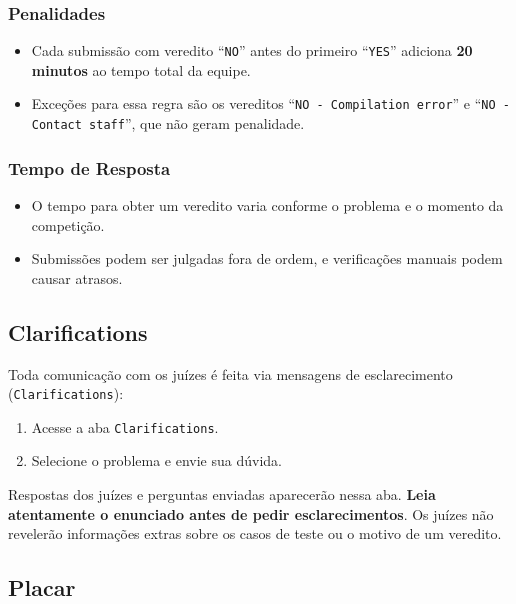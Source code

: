 \documentclass{article}
\begin{document}
\begin{titlepage}
\subsubsection{Penalidades}

\begin{itemize}
    \item Cada submissão com veredito ``\texttt{NO}'' antes do primeiro ``\texttt{YES}'' adiciona \textbf{20 minutos} ao tempo total da equipe.
    \item Exceções para essa regra são os vereditos ``\texttt{NO - Compilation error}'' e ``\texttt{NO - Contact staff}'', que não geram penalidade.
\end{itemize}

\subsubsection{Tempo de Resposta}

\begin{itemize}
    \item O tempo para obter um veredito varia conforme o problema e o momento da competição.
    \item Submissões podem ser julgadas fora de ordem, e verificações manuais podem causar atrasos.
\end{itemize}

\subsection{Clarifications}

Toda comunicação com os juízes é feita via mensagens de esclarecimento (\texttt{Clarifications}):

\begin{enumerate}
    \item Acesse a aba \texttt{Clarifications}.
    \item Selecione o problema e envie sua dúvida.
\end{enumerate}

\noindent Respostas dos juízes e perguntas enviadas aparecerão nessa aba. \textbf{Leia atentamente o enunciado antes de pedir esclarecimentos}. Os juízes não revelerão informações extras sobre os casos de teste ou o motivo de um veredito.

\subsection{Placar}


\end{titlepage}
\end{document}
